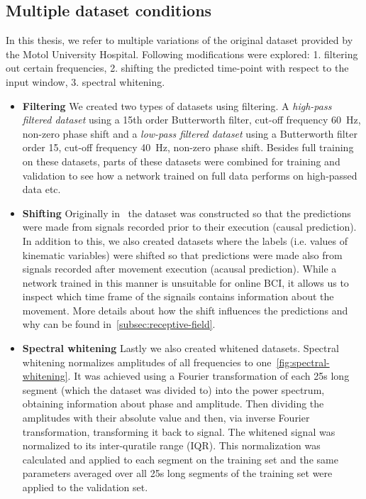 \subsection{Multiple dataset conditions}\label{subsec:modifications-to-the-dataset}
In this thesis, we refer to multiple variations of the original dataset provided by the Motol University Hospital.
Following modifications were explored:
1. filtering out certain frequencies, 2. shifting the predicted time-point with respect to the input window, 3. spectral whitening.
\begin{itemize}
\item \textbf{Filtering} We created two types of datasets using filtering.
A \textit{high-pass filtered dataset} using a 15th order Butterworth filter, cut-off frequency 60~Hz, non-zero phase shift and a \textit{low-pass filtered dataset} using a Butterworth filter order 15, cut-off frequency 40~Hz, non-zero phase shift.
Besides full training on these datasets, parts of these datasets were combined for training and validation to see how a network trained on full data performs on high-passed data etc.
\\

\item \textbf{Shifting} Originally in~\cite{Hammer-2021} the dataset was constructed so that the predictions were made from signals recorded prior to their execution (causal prediction).
In addition to this, we also created datasets where the labels (i.e. values of kinematic variables) were shifted so that predictions were made also from signals recorded after movement execution (acausal prediction).
While a network trained in this manner is unsuitable for online BCI, it allows us to inspect which time frame of the signails contains information about the movement.
More details about how the shift influences the predictions and why can be found in~\ref{subsec:receptive-field}. \\

\item \textbf{Spectral whitening} Lastly we also created whitened datasets.
Spectral whitening normalizes amplitudes of all frequencies to one~\ref{fig:spectral-whitening}.
It was achieved using a Fourier transformation of each 25s long segment (which the dataset was divided to) into the power spectrum, obtaining information about phase and amplitude.
Then dividing the amplitudes with their absolute value and then, via inverse Fourier transformation, transforming it back to signal.
The whitened signal was normalized to its inter-quratile range (IQR).
This normalization was calculated and applied to each segment on the training set and the same parameters averaged over all 25s long segments of the training set were applied to the validation set.
\end{itemize}

